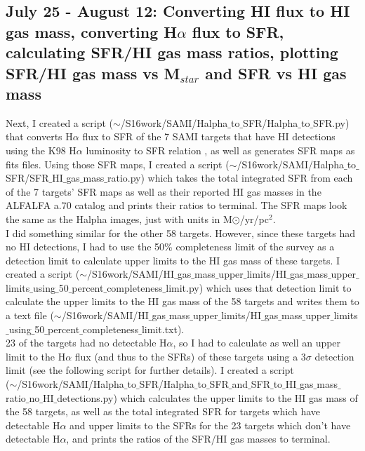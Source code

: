 \documentclass[10pt,letterpaper]{article}
\begin{document}
\subsection{July 25 - August 12: Converting HI flux to HI gas mass, converting H$\alpha$ flux to SFR, calculating SFR/HI gas mass ratios, plotting SFR/HI gas mass vs M$_{star}$ and SFR vs HI gas mass}
Next, I created a script ($\sim$/S16work/SAMI/Halpha$\_$to$\_$SFR/Halpha$\_$to$\_$SFR.py) that converts H$\alpha$ flux to SFR of the 7 SAMI targets that have HI detections using the K98 H$\alpha$ luminosity to SFR relation \cite{K98}, as well as generates SFR maps as fits files. Using those SFR maps, I created a script ($\sim$/S16work/SAMI/Halpha$\_$to$\_$SFR/SFR$\_$HI$\_$gas$\_$mass$\_$ratio.py) which takes the total integrated SFR from each of the 7 targets' SFR maps as well as their reported HI gas masses in the ALFALFA a.70 catalog and prints their ratios to terminal. The SFR maps look the same as the Halpha images, just with units in M$\odot$/yr/pc$^2$.\\

I did something similar for the other 58 targets. However, since these targets had no HI detections, I had to use the 50\% completeness limit of the survey as a detection limit \cite{sensitivity} to calculate upper limits to the HI gas mass of these targets. I created a script ($\sim$/S16work/SAMI/HI$\_$gas$\_$mass$\_$upper$\_$limits/HI$\_$gas$\_$mass$\_$upper$\_$limits$\_$using$\_$50$\_$percent$\_$completeness$\_$limit.py) which uses that detection limit to calculate the upper limits to the HI gas mass of the 58 targets and writes them to a text file ($\sim$/S16work/SAMI/HI$\_$gas$\_$mass$\_$upper$\_$limits/HI$\_$gas$\_$mass$\_$upper$\_$limits$\_$using$\_$50$\_$percent$\_$completeness$\_$limit.txt).\\

23 of the targets had no detectable H$\alpha$, so I had to calculate as well an upper limit to the H$\alpha$ flux (and thus to the SFRs) of these targets using a 3$\sigma$ detection limit (see the following script for further details). I created a script \\($\sim$/S16work/SAMI/Halpha$\_$to$\_$SFR/Halpha$\_$to$\_$SFR$\_$and$\_$SFR$\_$to$\_$HI$\_$gas$\_$mass$\_$ratio$\_$no$\_$HI$\_$detections.py) which calculates the upper limits to the HI gas mass of the 58 targets, as well as the total integrated SFR for targets which have detectable H$\alpha$ and upper limits to the SFRs for the 23 targets which don't have detectable H$\alpha$, and prints the ratios of the SFR/HI gas masses to terminal. \\
\end{document}
